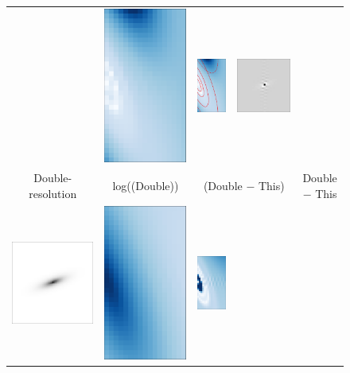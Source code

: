 \documentclass[11pt,preprint]{aastex}
\begin{document}
\begin{figure}[p!]
\begin{center}
\begin{tabular}{@{}ccccc@{}}
      &
      \includegraphics[height=0.24\textwidth]{lopass-diff-pixmine-fourier}
      &
      \includegraphics[height=0.24\textwidth]{lopass-diff-pixmine-fourier-ann}
      &
      \includegraphics[height=0.24\textwidth]{lopass-diff-pixmine-pix}
      \\
      Double-resolution
      &
      log(\F(Double))
      &
      \multicolumn{2}{c}{\F(Double $-$ This)}
      &
      Double $-$ This
      \\
      \includegraphics[height=0.24\textwidth]{lopass-dpix-pix}
      &
      \includegraphics[height=0.24\textwidth]{lopass-dclip-logfourier}
      &
      \includegraphics[height=0.24\textwidth]{lopass-diff-dclipmine-fourier}

\end{tabular}
\end{center}
\end{figure}
\end{document}
